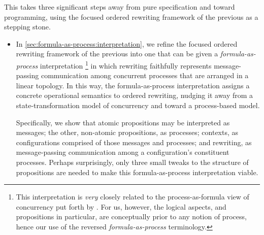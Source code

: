 This  takes three significant steps away from pure specification and toward programming, using the focused ordered rewriting framework of the previous  as a stepping stone.
\begin{itemize}[listparindent=\parindent, itemsep=\dimexpr\itemsep+\parsep\relax, parsep=0pt]
\item
  In \cref{sec:formula-as-process:interpretation}, we refine the focused ordered rewriting framework of the previous  into one that can be given a \emph{formula-as-process} interpretation%
  \footnote[][-5\baselineskip]{This interpretation is \emph{very} closely related to the process-as-formula view of concurrency put forth by \textcites{Miller:ELP92}{Cervesato+Scedrov:IC09}.
    For us, however, the logical aspects, and propositions in particular, are conceptually prior to any notion of process, hence our use of the reversed \emph{formula-as-process} terminology.}
  in which rewriting faithfully represents message-passing communication among concurrent processes that are arranged in a linear topology.
  In this way, the formula-as-process interpretation assigns a concrete operational semantics to ordered rewriting, nudging it away from a state-transformation model of concurrency and toward a process-based model.

  Specifically, we show that atomic propositions may be interpreted as messages;
  the other, non-atomic propositions, as processes;
  contexts, as configurations comprised of those messages and processes;
  and
  rewriting, as mes\-sage-passing communication among a configuration's con\-stit\-u\-ent processes.
  Perhaps surprisingly, only three small tweaks to the structure of propositions are needed to make this formula-as-process interpretation viable.




\end{itemize}

